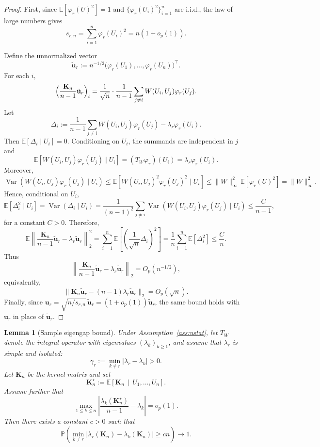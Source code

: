 \documentclass[11pt]{article}
\theoremstyle{plain}
\newtheorem{lemma}[theorem]{Lemma}
\theoremstyle{remark}
\DeclareMathOperator{\Var}{Var}
\newcommand{\E}{\mathbb{E}}
\begin{document}
\begin{proof}
First, since $\E[\varphi_r(U)^2]=1$ and $\{\varphi_r(U_i)^2\}_{i=1}^n$ are i.i.d.,
the law of large numbers gives
\[
s_{r,n}=\sum_{i=1}^n \varphi_r(U_i)^2 = n(1+o_p(1)).
\]

Define the unnormalized vector
\[
\tilde{\mathbf u}_r := n^{-1/2}\bigl(\varphi_r(U_1),\dots,\varphi_r(U_n)\bigr)^\top .
\]
For each $i$,
\[
\Bigl(\frac{\mathbf K_n}{n-1}\tilde{\mathbf u}_r\Bigr)_i
=
\frac{1}{\sqrt n}\cdot \frac{1}{n-1}\sum_{j\ne i} W(U_i,U_j)\varphi_r(U_j).
\]
Let
\[
\Delta_i
:=
\frac{1}{n-1}\sum_{j\ne i} W(U_i,U_j)\varphi_r(U_j)-\lambda_r\varphi_r(U_i).
\]
Then $\E[\Delta_i\mid U_i]=0$. Conditioning on $U_i$, the summands are independent in $j$ and
\[
\E\!\left[ W(U_i,U_j)\varphi_r(U_j)\mid U_i\right]
=(T_W\varphi_r)(U_i)=\lambda_r\varphi_r(U_i).
\]
Moreover,
\[
\Var\!\left(W(U_i,U_j)\varphi_r(U_j)\mid U_i\right)
\le
\E\!\left[W(U_i,U_j)^2\varphi_r(U_j)^2\mid U_i\right]
\le
\|W\|_\infty^2\,\E[\varphi_r(U)^2]
=
\|W\|_\infty^2.
\]
Hence, conditional on $U_i$,
\[
\E[\Delta_i^2\mid U_i]
=
\Var(\Delta_i\mid U_i)
=
\frac{1}{(n-1)^2}\sum_{j\ne i}\Var\!\left(W(U_i,U_j)\varphi_r(U_j)\mid U_i\right)
\le \frac{C}{n-1},
\]
for a constant $C>0$. Therefore,
\[
\E\left\|\frac{\mathbf K_n}{n-1}\tilde{\mathbf u}_r-\lambda_r\tilde{\mathbf u}_r\right\|_2^2
=
\sum_{i=1}^n \E\left[\left(\frac{1}{\sqrt n}\Delta_i\right)^2\right]
=
\frac{1}{n}\sum_{i=1}^n \E[\Delta_i^2]
\le \frac{C}{n}.
\]
Thus
\[
\left\|\frac{\mathbf K_n}{n-1}\tilde{\mathbf u}_r-\lambda_r\tilde{\mathbf u}_r\right\|_2
=O_p(n^{-1/2}),
\]
equivalently,
\[
\|\mathbf K_n\tilde{\mathbf u}_r-(n-1)\lambda_r\tilde{\mathbf u}_r\|_2
=O_p(\sqrt n).
\]
Finally, since $\mathbf u_r=\sqrt{n/s_{r,n}}\,\tilde{\mathbf u}_r=(1+o_p(1))\tilde{\mathbf u}_r$,
the same bound holds with $\mathbf u_r$ in place of $\tilde{\mathbf u}_r$.
\end{proof}


\begin{lemma}[Sample eigengap bound]\label{lem:eigengap}
Under Assumption~\ref{ass:ustat}, let $T_W$ denote the integral operator with
eigenvalues $(\lambda_k)_{k\ge1}$, and assume that $\lambda_r$ is simple and isolated:
\[
\gamma_r := \min_{k\neq r}|\lambda_r-\lambda_k|>0.
\]
Let $\mathbf{K}_n$ be the kernel matrix and set
\[
\mathbf{K}_n^\star := \E\!\left[\mathbf{K}_n\,\middle|\,U_1,\dots,U_n\right].
\]
Assume further that
\[
\max_{1\le k\le n}\left|\frac{\lambda_k(\mathbf K_n^\star)}{n-1}-\lambda_k\right|=o_p(1).
\]
Then there exists a constant $c>0$ such that
\[
\mathbb{P}\!\left(
\min_{k\neq r}
\big|\lambda_r(\mathbf{K}_n) - \lambda_k(\mathbf{K}_n)\big|
\ge c n
\right)\to 1.
\]
\end{lemma}
\end{document}
